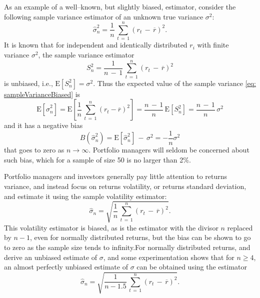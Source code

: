 \documentclass[graybox,envcountchap,sectrefs]{svmono}\usepackage[]{graphicx}\usepackage[]{xcolor}
\begin{document}
\begin{appendices}
As an example of a well--known, but slightly biased, estimator, consider
the following sample variance estimator of an unknown true variance
$\sigma^{2}$:
\begin{equation}
\hat{\sigma}_{n}^{2}=\frac{1}{n}\,{\displaystyle \sum_{t\,=\,1}^{n}}\left(r_{t}\,-\,\overline{r}\right)^{2}.\label{eq: sampleVarianceBiased}
\end{equation}
It is known that for independent and identically distributed $r_{i}$
with finite variance $\sigma^{2}$, the sample variance estimator
\begin{equation}
S_{n}^{2}=\frac{1}{n\,-\,1}\,{\displaystyle \sum_{t\,=\,1}^{n}}\left(r_{t}\,-\,\overline{r}\right)^{2}\label{eq: sampleVarianceUnbiased}
\end{equation}
is unbiased, i.e., $\mathrm{E}\left[S_{n}^{2}\right]=\sigma^{2}$.
Thus the expected value of the sample variance \eqref{eq: sampleVarianceBiased}
is
\begin{equation}
\mathrm{E}\left[\hat{\sigma}_{n}^{2}\right]=\mathrm{E}\left[\frac{1}{n}\,{\displaystyle \sum_{t\,=\,1}^{n}}\left(r_{t}-\overline{r}\right)^{2}\right]=\frac{n\,-\,1}{n}\,\mathrm{E}\left[S_{n}^{2}\right]=\frac{n\,-\,1}{n}\,\sigma^{2}\label{eq: biasedSampleVariance}
\end{equation}
and it has a negative bias
\begin{equation}
B\left(\hat{\sigma}_{n}^{2}\right)=\mathrm{E}\left[\hat{\sigma}_{n}^{2}\right]\,-\,\sigma^{2}=-\frac{1}{n}\sigma^{2}\label{eq: biasOfBiasedSampleVariance}
\end{equation}
that goes to zero as $n\rightarrow\infty$. Portfolio managers will
seldom be concerned about such bias, which for a sample of size 50
is no larger than 2\%.

Portfolio managers and investors generally pay little attention to
returns variance, and instead focus on returns volatility, or returns
standard deviation, and estimate it using the sample volatility estimator:
\begin{equation}
\hat{\sigma}_{n}=\sqrt{\frac{1}{n}\,{\displaystyle \sum_{t\,=\,1}^{n}}\left(r_{t}\,-\,\overline{r}\right)^{2}}.
\end{equation}
This volatility estimator is biased, as is the estimator with the
divisor $n$ replaced by $n-1$, even for normally distributed returns,
but the bias can be shown to go to zero as the sample size tends to
infinity.For normally distributed returns, \citet{Holtzman1950} and
\citet{AhnFessler2003} derive an unbiased estimate of $\sigma$,
and some experimentation shows that for $n\geqslant4$, an almost
perfectly unbiased estimate of $\sigma$ can be obtained using the
estimator
\begin{equation}
\hat{\sigma}_{n}=\sqrt{\frac{1}{n-1.5}\,{\displaystyle \sum_{t\,=\,1}^{n}}\left(r_{t}\,-\,\overline{r}\right)^{2}}.\label{eq:AhnFesslerUnbiasedEstimateOfSigma}
\end{equation}



\end{appendices}
\end{document}
